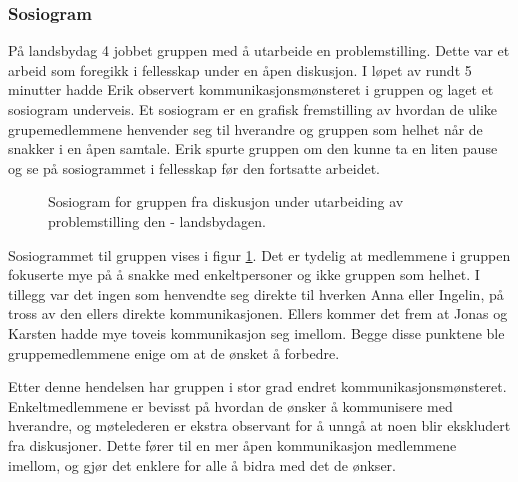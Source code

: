 \subsubsection{Sosiogram}
På landsbydag 4 jobbet gruppen med å utarbeide en problemstilling.
Dette var et arbeid som foregikk i fellesskap under en åpen diskusjon.
I løpet av rundt 5 minutter hadde Erik observert kommunikasjonsmønsteret i gruppen og laget et sosiogram underveis.
Et sosiogram er en grafisk fremstilling av hvordan de ulike grupemedlemmene henvender seg til hverandre og gruppen som helhet når de snakker i en åpen samtale.
Erik spurte gruppen om den kunne ta en liten pause og se på sosiogrammet i fellesskap før den fortsatte arbeidet.

\begin{figure}
\label{fig:sosiogram}
\caption{Sosiogram for gruppen fra diskusjon under utarbeiding av problemstilling den - landsbydagen.}
\begin{center}
\end{center}
\end{figure}

Sosiogrammet til gruppen vises i figur \ref{fig:sosiogram}. Det er tydelig at medlemmene i gruppen fokuserte mye på å snakke med enkeltpersoner og ikke gruppen som helhet.
I tillegg var det ingen som henvendte seg direkte til hverken Anna eller Ingelin, på tross av den ellers direkte kommunikasjonen.
Ellers kommer det frem at Jonas og Karsten hadde mye toveis kommunikasjon seg imellom.
Begge disse punktene ble gruppemedlemmene enige om at de ønsket å forbedre.

Etter denne hendelsen har gruppen i stor grad endret kommunikasjonsmønsteret.
Enkeltmedlemmene er bevisst på hvordan de ønsker å kommunisere med hverandre, og møtelederen er ekstra observant for å unngå at noen blir ekskludert fra diskusjoner.
Dette fører til en mer åpen kommunikasjon medlemmene imellom, og gjør det enklere for alle å bidra med det de ønkser.